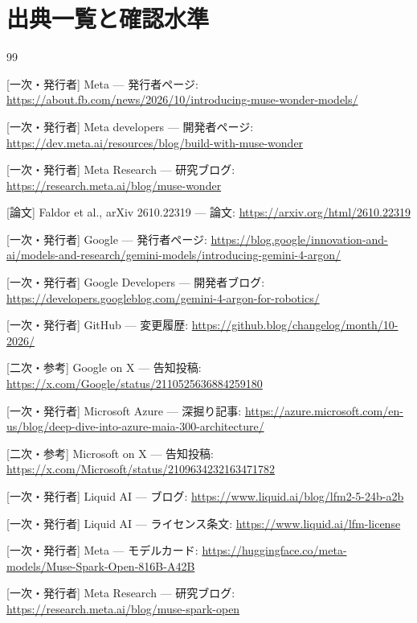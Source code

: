 \documentclass[lualatex,a4paper,10pt]{jlreq}
\begin{document}
\clearpage  %
\section*{出典一覧と確認水準}

\begin{thebibliography}{99}

 [一次・発行者] Meta — 発行者ページ: \url{https://about.fb.com/news/2026/10/introducing-muse-wonder-models/}

 [一次・発行者] Meta developers — 開発者ページ: \url{https://dev.meta.ai/resources/blog/build-with-muse-wonder}

 [一次・発行者] Meta Research — 研究ブログ: \url{https://research.meta.ai/blog/muse-wonder}

 [論文] Faldor et al., arXiv 2610.22319 — 論文: \url{https://arxiv.org/html/2610.22319}

 [一次・発行者] Google — 発行者ページ: \url{https://blog.google/innovation-and-ai/models-and-research/gemini-models/introducing-gemini-4-argon/}

 [一次・発行者] Google Developers — 開発者ブログ: \url{https://developers.googleblog.com/gemini-4-argon-for-robotics/}

 [一次・発行者] GitHub — 変更履歴: \url{https://github.blog/changelog/month/10-2026/}

 [二次・参考] Google on X — 告知投稿: \url{https://x.com/Google/status/2110525636884259180}

 [一次・発行者] Microsoft Azure — 深掘り記事: \url{https://azure.microsoft.com/en-us/blog/deep-dive-into-azure-maia-300-architecture/}

 [二次・参考] Microsoft on X — 告知投稿: \url{https://x.com/Microsoft/status/2109634232163471782}

 [一次・発行者] Liquid AI — ブログ: \url{https://www.liquid.ai/blog/lfm2-5-24b-a2b}

 [一次・発行者] Liquid AI — ライセンス条文: \url{https://www.liquid.ai/lfm-license}

 [一次・発行者] Meta — モデルカード: \url{https://huggingface.co/meta-models/Muse-Spark-Open-816B-A42B}

 [一次・発行者] Meta Research — 研究ブログ: \url{https://research.meta.ai/blog/muse-spark-open}


\end{thebibliography}
\end{document}
